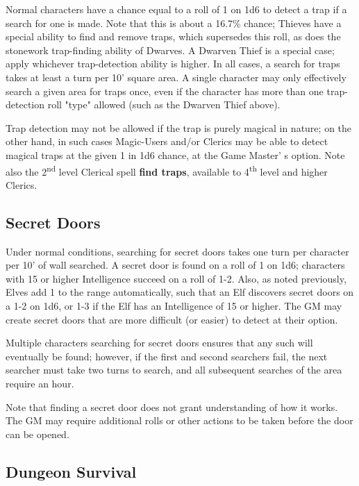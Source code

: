 \documentclass[a4paper,twoside,openany,10pt]{book}
\begin{document}
\begin{multicols}{2}
Normal characters have a chance equal to a roll of 1 on 1d6 to detect a trap if a search for one is made. Note that this is about a 16.7\% chance; Thieves have a special ability to find and remove traps, which supersedes this roll, as does the stonework trap-finding ability of Dwarves. A Dwarven Thief is a special case; apply whichever trap-detection ability is higher. In all cases, a search for traps takes at least a turn per 10' square area. A single character may only effectively search a given area for traps once, even if the character has more than one trap-detection roll "type" allowed (such as the Dwarven Thief above).

Trap detection may not be allowed if the trap is purely magical in nature; on the other hand, in such cases Magic-Users and/or Clerics may be able to detect magical traps at the given 1 in 1d6 chance, at the Game Master' s option. Note also the 2\textsuperscript{nd} level Clerical spell \textbf{find traps}, available to 4\textsuperscript{th} level and higher Clerics.

\subsection{Secret Doors}\label{secret-doors}

Under normal conditions, searching for secret doors takes one turn per character per 10' of wall searched. A secret door is found on a roll of 1 on 1d6; characters with 15 or higher Intelligence succeed on a roll of 1-2. Also, as noted previously, Elves add 1 to the range automatically, such that an Elf discovers secret doors on a 1-2 on 1d6, or 1-3 if the Elf has an Intelligence of 15 or higher. The GM may create secret doors that are more difficult (or easier) to detect at their option.

Multiple characters searching for secret doors ensures that any such will eventually be found; however, if the first and second searchers fail, the next searcher must take two turns to search, and all subsequent searches of the area require an hour.

Note that finding a secret door does not grant understanding of how it works. The GM may require additional rolls or other actions to be taken before the door can be opened.

\subsection{Dungeon Survival}\label{dungeon-survival}


\end{multicols}
\end{document}
